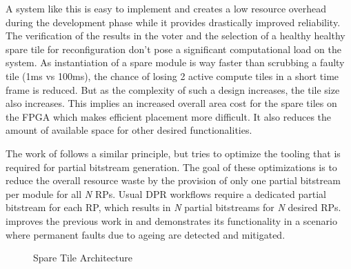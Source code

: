 A system like this is easy to implement and creates a low resource overhead during the development phase while it provides drastically improved reliability.
The verification of the results in the voter and the selection of a healthy healthy spare tile for reconfiguration don't pose a significant computational load on the system.
As instantiation of a spare module is way faster than scrubbing a faulty tile (1ms vs 100ms), the chance of losing 2 active compute tiles in a short time frame is reduced. 
But as the complexity of such a design increases, the tile size also increases. 
This implies an increased overall area cost for the spare tiles on the \gls{FPGA} which makes efficient placement more difficult.
It also reduces the amount of available space for other desired functionalities. 

The work of \cite{martins_tmr_2015} follows a similar principle, but tries to optimize the tooling that is required for partial bitstream generation.
The goal of these optimizations is to reduce the overall resource waste by the provision of only one partial bitstream per module for all \textit{N} \glspl{RP}. %
Usual \gls{DPR} workflows require a dedicated partial bitstream for each \gls{RP}, which results in \textit{N} partial bitstreams for \textit{N} desired \glspl{RP}.
\cite{martins_dynamic_2018} improves the previous work in \cite{martins_tmr_2015} and demonstrates its functionality in a scenario where permanent faults due to ageing are detected and mitigated.
\begin{center}
\begin{figure}[h]
    \centering
    \resizebox{\columnwidth}{!} {
        
    }
\caption{Spare Tile Architecture}
\label{fig:SpareTileArchitecture}
\end{figure}
\end{center}
